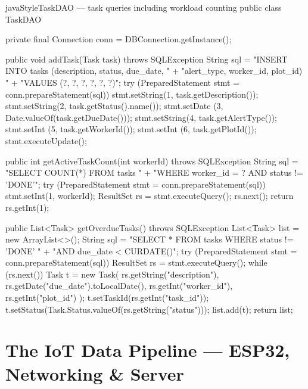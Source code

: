 \documentclass[12pt, a4paper]{report}
\begin{document}
\begin{codeblock}{javaStyle}{TaskDAO --- task queries including workload counting}
public class TaskDAO {
    private final Connection conn = DBConnection.getInstance();

    public void addTask(Task task) throws SQLException {
        String sql = "INSERT INTO tasks (description, status, due_date, "
                   + "alert_type, worker_id, plot_id) "
                   + "VALUES (?, ?, ?, ?, ?, ?)";
        try (PreparedStatement stmt = conn.prepareStatement(sql)) {
            stmt.setString(1, task.getDescription());
            stmt.setString(2, task.getStatus().name());
            stmt.setDate  (3, Date.valueOf(task.getDueDate()));
            stmt.setString(4, task.getAlertType());
            stmt.setInt   (5, task.getWorkerId());
            stmt.setInt   (6, task.getPlotId());
            stmt.executeUpdate();
        }
    }

    public int getActiveTaskCount(int workerId) throws SQLException {
        String sql = "SELECT COUNT(*) FROM tasks "
                   + "WHERE worker_id = ? AND status != 'DONE'";
        try (PreparedStatement stmt = conn.prepareStatement(sql)) {
            stmt.setInt(1, workerId);
            ResultSet rs = stmt.executeQuery();
            rs.next();
            return rs.getInt(1);
        }
    }

    public List<Task> getOverdueTasks() throws SQLException {
        List<Task> list = new ArrayList<>();
        String sql = "SELECT * FROM tasks WHERE status != 'DONE' "
                   + "AND due_date < CURDATE()";
        try (PreparedStatement stmt = conn.prepareStatement(sql)) {
            ResultSet rs = stmt.executeQuery();
            while (rs.next()) {
                Task t = new Task(
                    rs.getString("description"),
                    rs.getDate("due_date").toLocalDate(),
                    rs.getInt("worker_id"),
                    rs.getInt("plot_id")
                );
                t.setTaskId(rs.getInt("task_id"));
                t.setStatus(Task.Status.valueOf(rs.getString("status")));
                list.add(t);
            }
        }
        return list;
    }
}
\end{codeblock}


\chapter{The IoT Data Pipeline --- ESP32, Networking \& Server}
\end{document}
